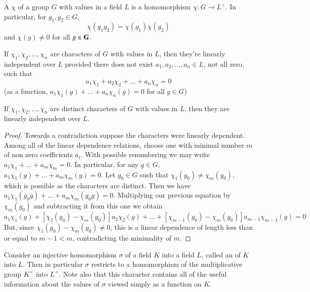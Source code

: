 \documentclass[12pt, a4paper, oneside, openright, titlepage]{book}
\begin{document}
\begin{defn}
    A  $\chi$ of a group $G$ with values in a field $L$ is a homomorphism $\chi:G\rightarrow L^{\times}$. In particular, for $g_1,g_2 \in G$, \begin{equation*}
        \chi(g_1g_2) = \chi(g_1)\chi(g_2)
    \end{equation*}
    and $\chi(g) \neq 0$ for all $g \in \mathbf{G}$.
\end{defn}

\begin{defn}
    If $\chi_1,\chi_2,...,\chi_n$ are characters of $G$ with values in $L$, then they're linearly independent over $L$ provided there does not exist $a_1,a_2,...,a_n \in L$, not all zero, such that \begin{equation*}
        a_1\chi_1+a_2\chi_2+...+a_n\chi_n = 0
    \end{equation*}
    (as a function, $a_1\chi_1(g)+...+a_n\chi_n(g) = 0$ for all $g \in G$)
\end{defn}


\begin{thm}
    If $\chi_1,\chi_2,...,\chi_n$ are distinct characters of $G$ with values in $L$, then they are linearly independent over $L$.
\end{thm}
\begin{proof}
    Towards a contradiction suppose the characters were linearly dependent. Among all of the linear dependence relations, choose one with minimal number $m$ of non zero coefficients $a_i$. With possible renumbering we may write $a_1\chi_1+...+a_m\chi_m = 0$. In particular, for any $g \in G$, $a_1\chi_1(g) + ... + a_m\chi_m(g) = 0$. Let $g_0 \in G$ such that $\chi_1(g_0) \neq \chi_m(g_0)$, which is possible as the characters are distinct. Then we have $a_1\chi_1(g_0g)+...+a_m\chi_m(g_0g) = 0$. Multiplying our previous equation by $\chi_m(g_0)$ and subtracting it from this one we obtain \begin{equation*}
        [\chi_1(g_0) - \chi_m(g_0)]a_1\chi_1(g)+[\chi_2(g_0)-\chi_m(g_0)]a_2\chi_2(g)+...+[\chi_{m-1}(g_0)-\chi_m(g_0)]a_{m-1}\chi_{m-1}(g) = 0
    \end{equation*}
    But, since $\chi_1(g_0) - \chi_m(g_0) \neq 0$, this is a linear dependence of length less than or equal to $m-1 < m$, contradicting the minimality of $m$.
\end{proof}
    

Consider an injective homomorphism $\sigma$ of a field $K$ into a field $L$, called an  of $K$ into $L$. Then in particular $\sigma$ restricts to a homomorphism of the multiplicative group $K^{\times}$ into $L^{\times}$. Note also that this character contains all of the useful information about the values of $\sigma$ viewed simply as a function on $K$.
\end{document}
